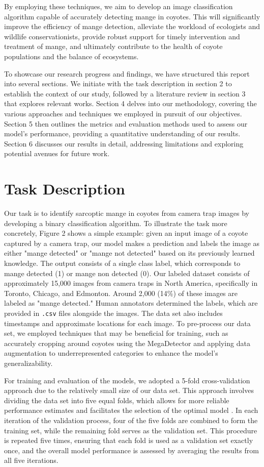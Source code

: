 \documentclass{article}
\begin{document}
By employing these techniques, we aim to develop an image classification algorithm capable of accurately detecting mange in coyotes. This will significantly improve the efficiency of mange detection, alleviate the workload of ecologists and wildlife conservationists, provide robust support for timely intervention and treatment of mange, and ultimately contribute to the health of coyote populations and the balance of ecosystems.

To showcase our research progress and findings, we have structured this report into several sections. We initiate with the task description in section 2 to establish the context of our study, followed by a literature review in section 3 that explores relevant works. Section 4 delves into our methodology, covering the various approaches and techniques we employed in pursuit of our objectives. Section 5 then outlines the metrics and evaluation methods used to assess our model's performance, providing a quantitative understanding of our results. Section 6 discusses our results in detail, addressing limitations and exploring potential avenues for future work. 

\section{Task Description}
Our task is to identify sarcoptic mange in coyotes from camera trap images by developing a binary classification algorithm. To illustrate the task more concretely, Figure 2 shows a simple example: given an input image of a coyote captured by a camera trap, our model makes a prediction and labels the image as either "mange detected" or "mange not detected" based on its previously learned knowledge. The output consists of a single class label, which corresponds to mange detected (1) or mange non detected (0).
Our labeled dataset consists of approximately 15,000 images from camera traps in North America, specifically in Toronto, Chicago, and Edmonton. Around 2,000 (14\%) of these images are labeled as "mange detected." Human annotators determined the labels, which are provided in \verb|.csv| files alongside the images. The data set also includes timestamps and approximate locations for each image. To pre-process our data set, we employed techniques that may be beneficial for training, such as accurately cropping around coyotes using the MegaDetector and applying data augmentation to underrepresented categories to enhance the model's generalizability.

For training and evaluation of the models, we adopted a 5-fold cross-validation approach due to the relatively small size of our data set. This approach involves dividing the data set into five equal folds, which allows for more reliable performance estimates and facilitates the selection of the optimal model \cite{Berrar2019, Schaffer1993}. In each iteration of the validation process, four of the five folds are combined to form the training set, while the remaining fold serves as the validation set. This procedure is repeated five times, ensuring that each fold is used as a validation set exactly once, and the overall model performance is assessed by averaging the results from all five iterations.
\end{document}
